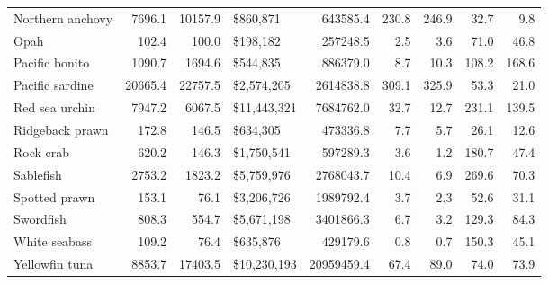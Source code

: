 \documentclass[
  letterpaper,
  DIV=11,
  numbers=noendperiod]{scrartcl}
\begin{document}
\begin{table}
{\begin{tabular}{lrrlrrrrr}
Northern anchovy & 7696.1 & 10157.9 & \$860,871 & 643585.4 & 230.8 & 246.9 & 32.7 & 9.8\\
Opah & 102.4 & 100.0 & \$198,182 & 257248.5 & 2.5 & 3.6 & 71.0 & 46.8\\
Pacific bonito & 1090.7 & 1694.6 & \$544,835 & 886379.0 & 8.7 & 10.3 & 108.2 & 168.6\\
\addlinespace
Pacific sardine & 20665.4 & 22757.5 & \$2,574,205 & 2614838.8 & 309.1 & 325.9 & 53.3 & 21.0\\
Red sea urchin & 7947.2 & 6067.5 & \$11,443,321 & 7684762.0 & 32.7 & 12.7 & 231.1 & 139.5\\
Ridgeback prawn & 172.8 & 146.5 & \$634,305 & 473336.8 & 7.7 & 5.7 & 26.1 & 12.6\\
Rock crab & 620.2 & 146.3 & \$1,750,541 & 597289.3 & 3.6 & 1.2 & 180.7 & 47.4\\
Sablefish & 2753.2 & 1823.2 & \$5,759,976 & 2768043.7 & 10.4 & 6.9 & 269.6 & 70.3\\
\addlinespace
Spotted prawn & 153.1 & 76.1 & \$3,206,726 & 1989792.4 & 3.7 & 2.3 & 52.6 & 31.1\\
Swordfish & 808.3 & 554.7 & \$5,671,198 & 3401866.3 & 6.7 & 3.2 & 129.3 & 84.3\\
White seabass & 109.2 & 76.4 & \$635,876 & 429179.6 & 0.8 & 0.7 & 150.3 & 45.1\\
Yellowfin tuna & 8853.7 & 17403.5 & \$10,230,193 & 20959459.4 & 67.4 & 89.0 & 74.0 & 73.9\\
\bottomrule
\end{tabular}}
\end{table}
\end{document}
